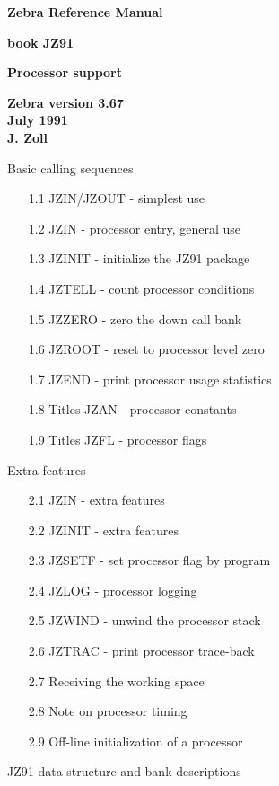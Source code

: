 \thispagestyle{empty}     %
\begin{center} {\large\bf Zebra Reference Manual} \vspace{8mm} \end{center}
\begin{center} {\LARGE\bf book JZ91} \vspace{2mm} \end{center}
\begin{center} {\Large\bf Processor support} \vspace{4mm} \end{center}
\begin{center}
  {\large\bf Zebra version 3.67 \vspace{2mm} \\
             July 1991          \vspace{2mm} \\
             J. Zoll}
\end{center}
\vspace*{20pt}
\begin{description}
  \in{30mm}
  \item[Chapter 1] Basic calling sequences
  \begin{itemize}
     \in{30mm}
     \item[1.1] JZIN/JZOUT - simplest use
     \item[1.2] JZIN   - processor entry, general use
     \item[1.3] JZINIT - initialize the JZ91 package
     \item[1.4] JZTELL - count processor conditions
     \item[1.5] JZZERO - zero the down call bank
     \item[1.6] JZROOT - reset to processor level zero
     \item[1.7] JZEND  - print processor usage statistics
     \item[1.8] Titles JZAN - processor constants
     \item[1.9] Titles JZFL - processor flags
  \end{itemize}
  \item[Chapter 2] Extra features
  \begin{itemize}
     \in{30mm}
     \item[2.1] JZIN   - extra features
     \item[2.2] JZINIT - extra features
     \item[2.3] JZSETF - set processor flag by program
     \item[2.4] JZLOG - processor logging
     \item[2.5] JZWIND - unwind the processor stack
     \item[2.6] JZTRAC - print processor trace-back
     \item[2.7] Receiving the working space
     \item[2.8] Note on processor timing
     \item[2.9] Off-line initialization of a processor
  \end{itemize}
  \item[Appendix] JZ91 data structure and bank descriptions
\end{description}
